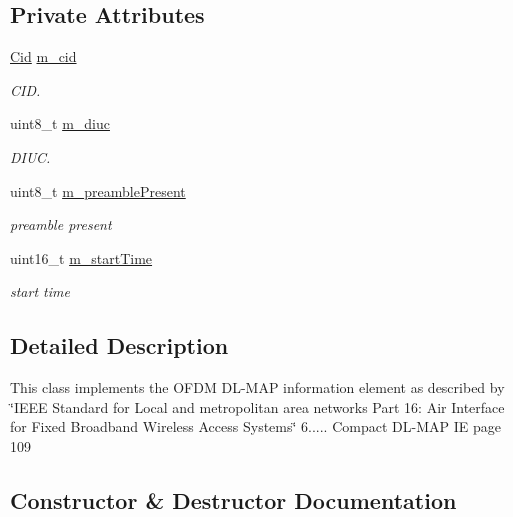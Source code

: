 \subsection*{Private Attributes}
\begin{DoxyCompactItemize}
\item 
\hyperlink{classns3_1_1Cid}{Cid} \hyperlink{classns3_1_1OfdmDlMapIe_a449506430dde266b5a31461243c85116}{m\+\_\+cid}
\begin{DoxyCompactList}\small\item\em C\+ID. \end{DoxyCompactList}\item 
uint8\+\_\+t \hyperlink{classns3_1_1OfdmDlMapIe_af9ab0f7049e9a6efb1d48ac02e4c09a8}{m\+\_\+diuc}
\begin{DoxyCompactList}\small\item\em D\+I\+UC. \end{DoxyCompactList}\item 
uint8\+\_\+t \hyperlink{classns3_1_1OfdmDlMapIe_a313d26870dfa890bb0246cad2c268a83}{m\+\_\+preamble\+Present}
\begin{DoxyCompactList}\small\item\em preamble present \end{DoxyCompactList}\item 
uint16\+\_\+t \hyperlink{classns3_1_1OfdmDlMapIe_a4d54e49b6f8867735059cd476c228cac}{m\+\_\+start\+Time}
\begin{DoxyCompactList}\small\item\em start time \end{DoxyCompactList}\end{DoxyCompactItemize}


\subsection{Detailed Description}
This class implements the O\+F\+DM D\+L-\/\+M\+AP information element as described by \char`\"{}\+I\+E\+E\+E Standard for
\+Local and metropolitan area networks Part 16\+: Air Interface for Fixed Broadband Wireless Access Systems\char`\"{} 6..... Compact D\+L-\/\+M\+AP IE page 109 

\subsection{Constructor \& Destructor Documentation}
